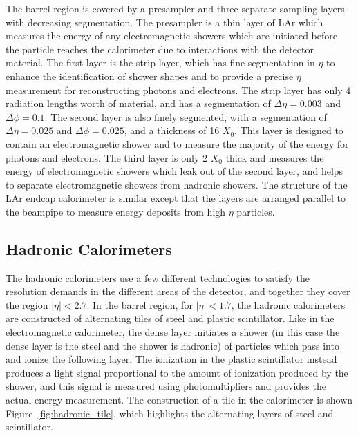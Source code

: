 The barrel region is covered by a presampler and three separate sampling layers with decreasing segmentation.
The presampler is a thin layer of \acl{LAr} which measures the energy of any electromagnetic showers which are initiated before the particle reaches the calorimeter due to interactions with the detector material.
The first layer is the strip layer, which has fine segmentation in $\eta$ to enhance the identification of shower shapes and to provide a precise $\eta$ measurement for reconstructing photons and electrons.
The strip layer has only 4 radiation lengths worth of material, and has a segmentation of $\Delta\eta = 0.003$ and $\Delta\phi = 0.1$. 
The second layer is also finely segmented, with a segmentation of $\Delta\eta = 0.025$ and $\Delta\phi = 0.025$, and a thickness of 16 $X_0$.
This layer is designed to contain an electromagnetic shower and to measure the majority of the energy for photons and electrons.
The third layer is only 2 $X_0$ thick and measures the energy of electromagnetic showers which leak out of the second layer, and helps to separate electromagnetic showers from hadronic showers. 
The structure of the \ac{LAr} endcap calorimeter is similar except that the layers are arranged parallel to the beampipe to measure energy deposits from high $\eta$ particles.


\subsection{Hadronic Calorimeters}

The hadronic calorimeters use a few different technologies to satisfy the resolution demands in the different areas of the detector, and together they cover the region $|\eta| < 2.7$.
In the barrel region, for $|\eta| < 1.7$, the hadronic calorimeters are constructed of alternating tiles of steel and plastic scintillator. 
Like in the electromagnetic calorimeter, the dense layer initiates a shower (in this case the dense layer is the steel and the shower is hadronic) of particles which pass into and ionize the following layer.
The ionization in the plastic scintillator instead produces a light signal proportional to the amount of ionization produced by the shower, and this signal is measured using photomultipliers and provides the actual energy measurement.
The construction of a tile in the calorimeter is shown Figure~\ref{fig:hadronic_tile}, which highlights the alternating layers of steel and scintillator.

